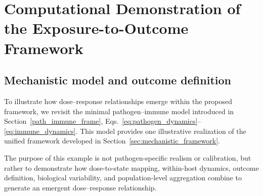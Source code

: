 \documentclass[11pt]{article}
\begin{document}
\section{Computational Demonstration of the Exposure-to-Outcome Framework}\label{sec:computational_demonstration}

\subsection{Mechanistic model and outcome definition}
\label{sec:illustrative_example}



To illustrate how dose--response relationships emerge within
the proposed framework, we revisit the minimal pathogen--immune
model introduced in Section~\ref{path_immune_frame}, Eqs.~\eqref{eq:pathogen_dynamics}--\eqref{eq:immune_dynamics}.
This model provides one illustrative realization of the unified framework developed in Section~\ref{sec:mechanistic_framework}.

The purpose of this example is not pathogen-specific realism
or calibration, but rather to demonstrate how dose-to-state
mapping, within-host dynamics, outcome definition, biological
variability, and population-level aggregation combine to
generate an emergent dose--response relationship.
\end{document}
